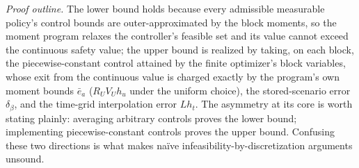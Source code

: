 \documentclass[10pt,twocolumn]{article}
\theoremstyle{plain}
\theoremstyle{definition}
\theoremstyle{remark}
\begin{document}
\emph{Proof outline.} The lower bound holds because every admissible
measurable policy's control bounds are outer-approximated by the block
moments, so the moment program relaxes the controller's feasible set and
its value cannot exceed the continuous safety value; the upper bound is
realized by taking, on each block, the piecewise-constant control attained
by the finite optimizer's block variables, whose exit from the continuous
value is charged exactly by the program's own moment bounds \(\bar{e}_a\)
(\(R_U V_U h_u\) under the uniform choice), the stored-scenario error
\(\delta_\beta\), and the time-grid interpolation error \(L h_t\). The asymmetry at its core is
worth stating plainly: averaging arbitrary controls proves the lower bound;
implementing piecewise-constant controls proves the upper bound. Confusing
these two directions is what makes na\"ive infeasibility-by-discretization
arguments unsound.
\end{document}
